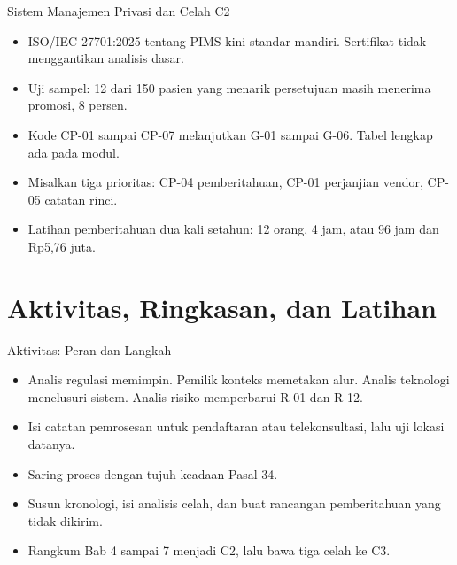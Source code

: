 \documentclass[aspectratio=169, table, 12pt]{beamer}
\begin{document}
\begin{frame}{{\Large Sistem Manajemen Privasi dan Celah C2}}
  \vspace{6pt}
  \small
  \begin{itemize}
    \item ISO/IEC 27701:2025 tentang PIMS kini standar mandiri. Sertifikat tidak menggantikan
          analisis dasar.
    \item Uji sampel: 12 dari 150 pasien yang menarik persetujuan masih menerima promosi, 8 persen.
    \item Kode CP-01 sampai CP-07 melanjutkan G-01 sampai G-06. Tabel lengkap ada pada modul.
    \item Misalkan tiga prioritas: CP-04 pemberitahuan, CP-01 perjanjian vendor, CP-05
          catatan rinci.
    \item Latihan pemberitahuan dua kali setahun: 12 orang, 4 jam, atau 96 jam dan Rp5,76 juta.
  \end{itemize}
\end{frame}

\section{Aktivitas, Ringkasan, dan Latihan}

\begin{frame}{{\Large Aktivitas: Peran dan Langkah}}
  \vspace{6pt}
  \small
  \begin{itemize}
    \item Analis regulasi memimpin. Pemilik konteks memetakan alur. Analis teknologi menelusuri
          sistem. Analis risiko memperbarui R-01 dan R-12.
    \item Isi catatan pemrosesan untuk pendaftaran atau telekonsultasi, lalu uji lokasi datanya.
    \item Saring proses dengan tujuh keadaan Pasal 34.
    \item Susun kronologi, isi analisis celah, dan buat rancangan pemberitahuan yang tidak dikirim.
    \item Rangkum Bab 4 sampai 7 menjadi C2, lalu bawa tiga celah ke C3.
  \end{itemize}
\end{frame}
\end{document}
